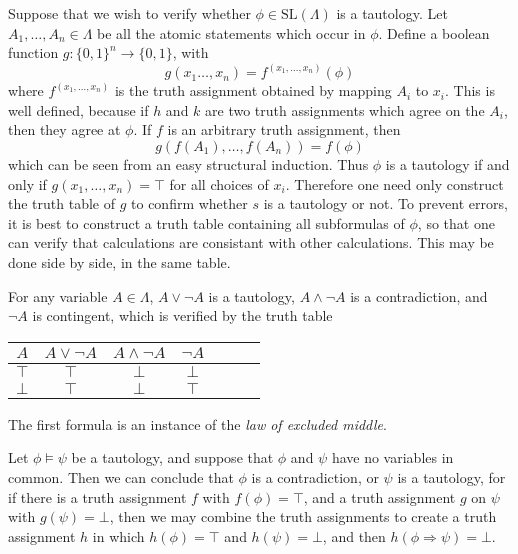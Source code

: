Suppose that we wish to verify whether $\phi \in \text{SL}(\Lambda)$ is a tautology. Let $A_1, \dots, A_n \in \Lambda$ be all the atomic statements which occur in $\phi$. Define a boolean function $g: \{ 0, 1 \}^n \to \{ 0, 1 \}$, with
%
\[ g(x_1 \dots, x_n) = f^{(x_1, \dots, x_n)}(\phi) \]
%
where $f^{(x_1, \dots, x_n)}$ is the truth assignment obtained by mapping $A_i$ to $x_i$. This is well defined, because if $h$ and $k$ are two truth assignments which agree on the $A_i$, then they agree at $\phi$. If $f$ is an arbitrary truth assignment, then
%
\[ g(f(A_1), \dots, f(A_n)) = f(\phi) \]
%
which can be seen from an easy structural induction. Thus $\phi$ is a tautology if and only if $g(x_1, \dots, x_n) = \top$ for all choices of $x_i$. Therefore one need only construct the truth table of $g$ to confirm whether $s$ is a tautology or not. To prevent errors, it is best to construct a truth table containing all subformulas of $\phi$, so that one can verify that calculations are consistant with other calculations. This may be done side by side, in the same table.

\begin{example}
    For any variable $A \in \Lambda$, $A \vee \neg A$ is a tautology, $A \wedge \neg A$ is a contradiction, and $\neg A$ is contingent, which is verified by the truth table
    \begin{center}
    \begin{tabular}{| c | c | c | c | c | c | c |}
        \hline $A$ & $A \vee \neg A$ & $A \wedge \neg A$ & $\neg A$ \\
        \hline $\top$ & $\top$ & $\bot$ & $\bot$ \\
               $\bot$ & $\top$ & $\bot$ & $\top$ \\
        \hline
    \end{tabular}
    \end{center}
    The first formula is an instance of the \emph{law of excluded middle}.
\end{example}

\begin{example}
    Let $\phi \vDash \psi$ be a tautology, and suppose that $\phi$ and $\psi$ have no variables in common. Then we can conclude that $\phi$ is a contradiction, or $\psi$ is a tautology, for if there is a truth assignment $f$ with $f(\phi) = \top$, and a truth assignment $g$ on $\psi$ with $g(\psi) = \bot$, then we may combine the truth assignments to create a truth assignment $h$ in which $h(\phi) = \top$ and $h(\psi) = \bot$, and then $h(\phi \Rightarrow \psi) = \bot$.
\end{example}

